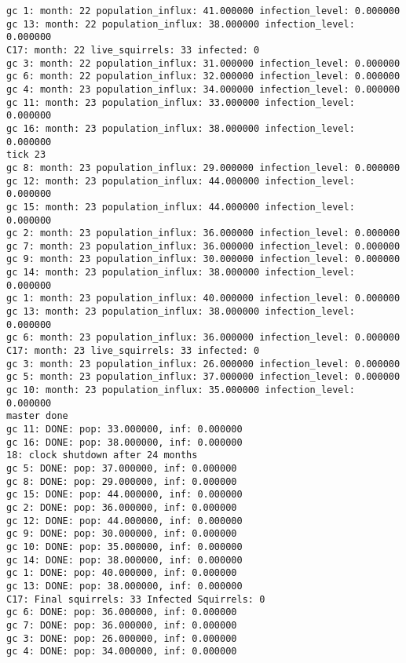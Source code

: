 \begin{lstlisting}[basicstyle=\small]
gc 1: month: 22 population_influx: 41.000000 infection_level: 0.000000
gc 13: month: 22 population_influx: 38.000000 infection_level: 0.000000
C17: month: 22 live_squirrels: 33 infected: 0
gc 3: month: 22 population_influx: 31.000000 infection_level: 0.000000
gc 6: month: 22 population_influx: 32.000000 infection_level: 0.000000
gc 4: month: 23 population_influx: 34.000000 infection_level: 0.000000
gc 11: month: 23 population_influx: 33.000000 infection_level: 0.000000
gc 16: month: 23 population_influx: 38.000000 infection_level: 0.000000
tick 23
gc 8: month: 23 population_influx: 29.000000 infection_level: 0.000000
gc 12: month: 23 population_influx: 44.000000 infection_level: 0.000000
gc 15: month: 23 population_influx: 44.000000 infection_level: 0.000000
gc 2: month: 23 population_influx: 36.000000 infection_level: 0.000000
gc 7: month: 23 population_influx: 36.000000 infection_level: 0.000000
gc 9: month: 23 population_influx: 30.000000 infection_level: 0.000000
gc 14: month: 23 population_influx: 38.000000 infection_level: 0.000000
gc 1: month: 23 population_influx: 40.000000 infection_level: 0.000000
gc 13: month: 23 population_influx: 38.000000 infection_level: 0.000000
gc 6: month: 23 population_influx: 36.000000 infection_level: 0.000000
C17: month: 23 live_squirrels: 33 infected: 0
gc 3: month: 23 population_influx: 26.000000 infection_level: 0.000000
gc 5: month: 23 population_influx: 37.000000 infection_level: 0.000000
gc 10: month: 23 population_influx: 35.000000 infection_level: 0.000000
master done
gc 11: DONE: pop: 33.000000, inf: 0.000000
gc 16: DONE: pop: 38.000000, inf: 0.000000
18: clock shutdown after 24 months
gc 5: DONE: pop: 37.000000, inf: 0.000000
gc 8: DONE: pop: 29.000000, inf: 0.000000
gc 15: DONE: pop: 44.000000, inf: 0.000000
gc 2: DONE: pop: 36.000000, inf: 0.000000
gc 12: DONE: pop: 44.000000, inf: 0.000000
gc 9: DONE: pop: 30.000000, inf: 0.000000
gc 10: DONE: pop: 35.000000, inf: 0.000000
gc 14: DONE: pop: 38.000000, inf: 0.000000
gc 1: DONE: pop: 40.000000, inf: 0.000000
gc 13: DONE: pop: 38.000000, inf: 0.000000
C17: Final squirrels: 33 Infected Squirrels: 0
gc 6: DONE: pop: 36.000000, inf: 0.000000
gc 7: DONE: pop: 36.000000, inf: 0.000000
gc 3: DONE: pop: 26.000000, inf: 0.000000
gc 4: DONE: pop: 34.000000, inf: 0.000000
\end{lstlisting}
